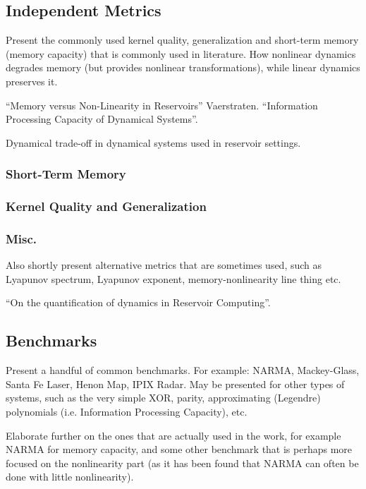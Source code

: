 \subsection{Independent Metrics}

Present the commonly used kernel quality, generalization and short-term memory
(memory capacity) that is commonly used in literature. How nonlinear dynamics
degrades memory (but provides nonlinear transformations), while linear dynamics
preserves it.

``Memory versus Non-Linearity in Reservoirs'' Vaerstraten.
``Information Processing Capacity of Dynamical Systems''.

Dynamical trade-off in dynamical systems used in reservoir settings.

\subsubsection{Short-Term Memory}

\subsubsection{Kernel Quality and Generalization}

\subsubsection{Misc.}

Also shortly present alternative metrics that are sometimes used, such as
Lyapunov spectrum, Lyapunov exponent, memory-nonlinearity line thing etc.

``On the quantification of dynamics in Reservoir Computing''.

\subsection{Benchmarks}

Present a handful of common benchmarks. For example: NARMA, Mackey-Glass, Santa
Fe Laser, Henon Map, IPIX Radar. May be presented for other types of systems,
such as the very simple XOR, parity, approximating (Legendre) polynomials
(i.e. Information Processing Capacity), etc.

Elaborate further on the ones that are actually used in the work, for example
NARMA for memory capacity, and some other benchmark that is perhaps more focused
on the nonlinearity part (as it has been found that NARMA can often be done with
little nonlinearity).

